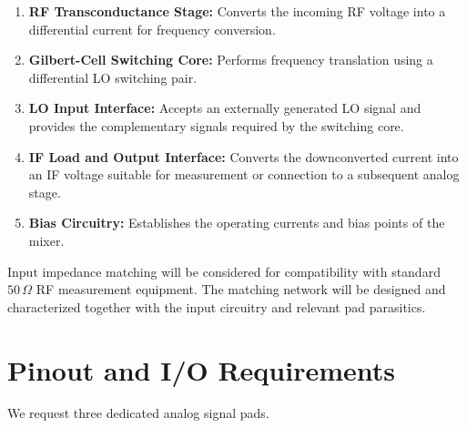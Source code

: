 \documentclass[11pt,letterpaper]{article}
\begin{document}
\begin{enumerate}
    \item \textbf{RF Transconductance Stage:}
    Converts the incoming RF voltage into a differential
    current for frequency conversion.

    \item \textbf{Gilbert-Cell Switching Core:}
    Performs frequency translation using a differential
    LO switching pair.

    \item \textbf{LO Input Interface:}
    Accepts an externally generated LO signal and
    provides the complementary signals required by the
    switching core. %

    \item \textbf{IF Load and Output Interface:}
    Converts the downconverted current into an IF voltage
    suitable for measurement or connection to a
    subsequent analog stage.

    \item \textbf{Bias Circuitry:}
    Establishes the operating currents and bias points
    of the mixer. %
\end{enumerate}


Input impedance matching will be considered for
compatibility with standard \(50\,\Omega\) RF measurement
equipment. The matching network will be designed and
characterized together with the input circuitry and
relevant pad parasitics.


\section{Pinout and I/O Requirements}

We request three dedicated analog signal pads.
\end{document}
